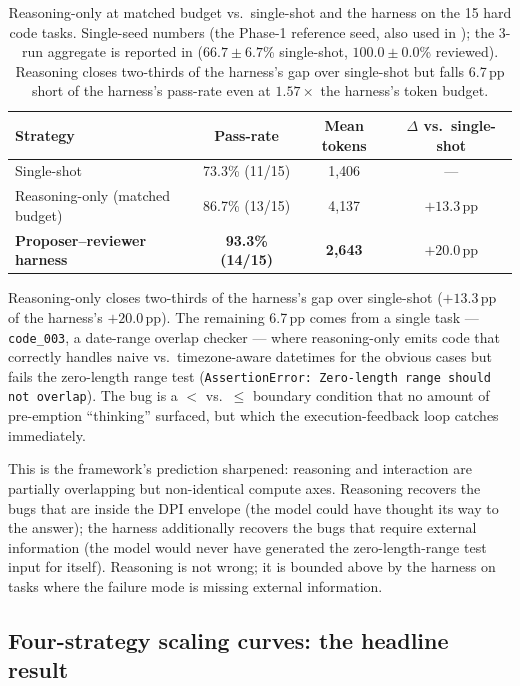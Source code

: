 \documentclass[11pt]{article}
\begin{document}
\begin{table}[ht]
\centering
\caption{Reasoning-only at matched budget vs.\ single-shot and the harness on the 15 hard code tasks. Single-seed numbers (the Phase-1 reference seed, also used in ); the 3-run aggregate is reported in  ($66.7 \pm 6.7$\% single-shot, $100.0 \pm 0.0$\% reviewed). Reasoning closes two-thirds of the harness's gap over single-shot but falls 6.7\,pp short of the harness's pass-rate even at $1.57\times$ the harness's token budget.}
\label{tab:reasoning-baseline}
\small
\begin{tabular}{lccc}
\toprule
Strategy & Pass-rate & Mean tokens & $\Delta$ vs.\ single-shot \\
\midrule
Single-shot                       & 73.3\% (11/15) & 1{,}406  & --- \\
Reasoning-only (matched budget)   & 86.7\% (13/15) & 4{,}137  & $+13.3$\,pp \\
\textbf{Proposer--reviewer harness} & \textbf{93.3\% (14/15)} & \textbf{2{,}643}  & $\mathbf{+20.0}$\,pp \\
\bottomrule
\end{tabular}
\end{table}

Reasoning-only closes two-thirds of the harness's gap over single-shot ($+13.3$\,pp of the harness's $+20.0$\,pp). The remaining 6.7\,pp comes from a single task --- \texttt{code\_003}, a date-range overlap checker --- where reasoning-only emits code that correctly handles naive vs.\ timezone-aware datetimes for the obvious cases but fails the zero-length range test (\texttt{AssertionError: Zero-length range should not overlap}). The bug is a $<$ vs.\ $\leq$ boundary condition that no amount of pre-emption ``thinking'' surfaced, but which the execution-feedback loop catches immediately.

This is the framework's prediction sharpened: reasoning and interaction are partially overlapping but non-identical compute axes. Reasoning recovers the bugs that are inside the DPI envelope (the model could have thought its way to the answer); the harness additionally recovers the bugs that require external information (the model would never have generated the zero-length-range test input for itself). Reasoning is not wrong; it is bounded above by the harness on tasks where the failure mode is missing external information.

\subsection{Four-strategy scaling curves: the headline result}
\label{sec:harness-scaling}
\end{document}
